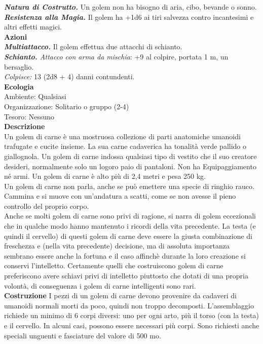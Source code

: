 \begin{multicols}{2}
\emph{\textbf{Natura di Costrutto.}} Un golem non ha bisogno di aria, cibo, bevande o sonno.\\
\emph{\textbf{Resistenza alla Magia.}} Il golem ha +1d6 ai tiri salvezza contro incantesimi e altri effetti magici.\\
\smallskip\textbf{Azioni}\\
\emph{\textbf{Multiattacco.}} Il golem effettua due attacchi di schianto.\\
\emph{\textbf{Schianto.} Attacco con arma da mischia}: +9 al colpire, portata 1 m, un bersaglio.\\
\emph{Colpisce:} 13 (2d8 + 4) danni contundenti.\\
\textbf{Ecologia}\\
Ambiente: Qualsiasi\\
Organizzazione: Solitario o gruppo (2-4)\\
Tesoro: Nessuno\\
\textbf{Descrizione}\\
Un golem di carne è una mostruosa collezione di parti anatomiche umanoidi trafugate e cucite insieme. La sua carne cadaverica ha tonalità verde pallido o giallognola. Un golem di carne indossa qualsiasi tipo di vestito che il suo creatore desideri, normalmente solo un logoro paio di pantaloni. Non ha Equipaggiamento né armi. Un golem di carne è alto più di 2,4 metri e pesa 250 kg.\\

Un golem di carne non parla, anche se può emettere una specie di ringhio rauco. Cammina e si muove con un’andatura a scatti, come se non avesse il pieno controllo del proprio corpo.\\

Anche se molti golem di carne sono privi di ragione, si narra di golem eccezionali che in qualche modo hanno mantenuto i ricordi della vita precedente. La testa (e quindi il cervello) di questi golem di carne deve essere la giusta combinazione di freschezza e (nella vita precedente) decisione, ma di assoluta importanza sembrano essere anche la fortuna e il caso affinchè durante la loro creazione si conservi l’intelletto. Certamente quelli che costruiscono golem di carne preferiscono avere schiavi privi di intelletto piuttosto che dotati di una propria volontà, di conseguenza i golem di carne intelligenti sono rari.\\

\textbf{Costruzione}
I pezzi di un golem di carne devono provenire da cadaveri di umanoidi normali morti da poco, quindi non troppo decomposti. L’assemblaggio richiede un minimo di 6 corpi diversi: uno per ogni arto, più il torso (con la testa) e il cervello. In alcuni casi, possono essere necessari più corpi. Sono richiesti anche speciali unguenti e fasciature del valore di 500 mo.\\


\end{multicols}
